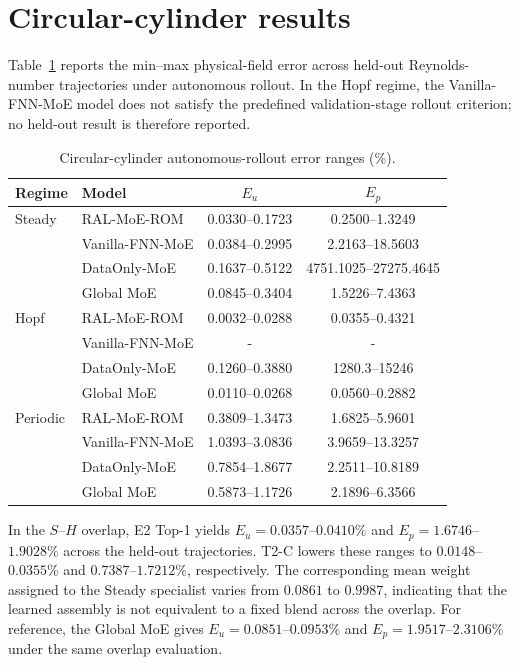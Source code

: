 \section{Circular-cylinder results}
\label{app:circular}

Table~\ref{tab:circular_full} reports the min--max physical-field error across held-out Reynolds-number trajectories under autonomous rollout. In the Hopf regime, the Vanilla-FNN-MoE model does not satisfy the predefined validation-stage rollout criterion; no held-out result is therefore reported.

\begin{table}[h]
\centering
\caption{Circular-cylinder autonomous-rollout error ranges (\%). }
\label{tab:circular_full}
\small
\setlength{\tabcolsep}{4pt}
\begin{tabular}{llcc}
\toprule
Regime & Model & $E_u$ & $E_p$ \\
\midrule
Steady & RAL-MoE-ROM & 0.0330--0.1723 & 0.2500--1.3249 \\
 & Vanilla-FNN-MoE & 0.0384--0.2995 & 2.2163--18.5603 \\
 & DataOnly-MoE & 0.1637--0.5122 & 4751.1025--27275.4645 \\
 & Global MoE & 0.0845--0.3404 & 1.5226--7.4363 \\
\midrule
Hopf & RAL-MoE-ROM & 0.0032--0.0288 & 0.0355--0.4321 \\
 & Vanilla-FNN-MoE & - & -  \\
 & DataOnly-MoE & 0.1260--0.3880 & 1280.3--15246 \\
 & Global MoE & 0.0110--0.0268 & 0.0560--0.2882 \\
\midrule
Periodic & RAL-MoE-ROM & 0.3809--1.3473 & 1.6825--5.9601 \\
 & Vanilla-FNN-MoE & 1.0393--3.0836 & 3.9659--13.3257 \\
 & DataOnly-MoE & 0.7854--1.8677 & 2.2511--10.8189 \\
 & Global MoE & 0.5873--1.1726 & 2.1896--6.3566 \\
\bottomrule
\end{tabular}
\end{table}

In the $S$--$H$ overlap, E2 Top-1 yields $E_u=0.0357$--$0.0410\%$ and
$E_p=1.6746$--$1.9028\%$ across the held-out trajectories. T2-C lowers these ranges to $0.0148$--$0.0355\%$ and $0.7387$--$1.7212\%$, respectively. The corresponding mean weight assigned to the Steady specialist varies from $0.0861$ to $0.9987$, indicating that the learned assembly is not equivalent to a fixed blend across the overlap. For reference, the Global MoE gives $E_u=0.0851$--$0.0953\%$ and $E_p=1.9517$--$2.3106\%$ under the same overlap evaluation.
